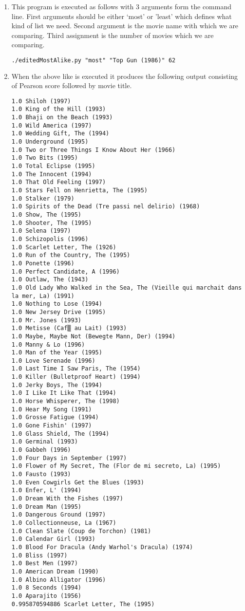 \begin{enumerate}
\item This program is executed as follows with 3 arguments form the command line. First arguments should be either `most' or 'least' which defines what kind of list we need. Second argument is the movie name with which we are comparing. Third assignment is the number of movies which we are comparing.
\begin{lstlisting}[frame=single]
 ./editedMostAlike.py "most" "Top Gun (1986)" 62
\end{lstlisting}
\item When the above like is executed it produces the following output consisting of Pearson score followed by movie title. 
\begin{lstlisting}[frame=single,breaklines=true]
1.0 Shiloh (1997)
1.0 King of the Hill (1993)
1.0 Bhaji on the Beach (1993)
1.0 Wild America (1997)
1.0 Wedding Gift, The (1994)
1.0 Underground (1995)
1.0 Two or Three Things I Know About Her (1966)
1.0 Two Bits (1995)
1.0 Total Eclipse (1995)
1.0 The Innocent (1994)
1.0 That Old Feeling (1997)
1.0 Stars Fell on Henrietta, The (1995)
1.0 Stalker (1979)
1.0 Spirits of the Dead (Tre passi nel delirio) (1968)
1.0 Show, The (1995)
1.0 Shooter, The (1995)
1.0 Selena (1997)
1.0 Schizopolis (1996)
1.0 Scarlet Letter, The (1926)
1.0 Run of the Country, The (1995)
1.0 Ponette (1996)
1.0 Perfect Candidate, A (1996)
1.0 Outlaw, The (1943)
1.0 Old Lady Who Walked in the Sea, The (Vieille qui marchait dans la mer, La) (1991)
1.0 Nothing to Lose (1994)
1.0 New Jersey Drive (1995)
1.0 Mr. Jones (1993)
1.0 Metisse (Caf▒ au Lait) (1993)
1.0 Maybe, Maybe Not (Bewegte Mann, Der) (1994)
1.0 Manny & Lo (1996)
1.0 Man of the Year (1995)
1.0 Love Serenade (1996)
1.0 Last Time I Saw Paris, The (1954)
1.0 Killer (Bulletproof Heart) (1994)
1.0 Jerky Boys, The (1994)
1.0 I Like It Like That (1994)
1.0 Horse Whisperer, The (1998)
1.0 Hear My Song (1991)
1.0 Grosse Fatigue (1994)
1.0 Gone Fishin' (1997)
1.0 Glass Shield, The (1994)
1.0 Germinal (1993)
1.0 Gabbeh (1996)
1.0 Four Days in September (1997)
1.0 Flower of My Secret, The (Flor de mi secreto, La) (1995)
1.0 Fausto (1993)
1.0 Even Cowgirls Get the Blues (1993)
1.0 Enfer, L' (1994)
1.0 Dream With the Fishes (1997)
1.0 Dream Man (1995)
1.0 Dangerous Ground (1997)
1.0 Collectionneuse, La (1967)
1.0 Clean Slate (Coup de Torchon) (1981)
1.0 Calendar Girl (1993)
1.0 Blood For Dracula (Andy Warhol's Dracula) (1974)
1.0 Bliss (1997)
1.0 Best Men (1997)
1.0 American Dream (1990)
1.0 Albino Alligator (1996)
1.0 8 Seconds (1994)
1.0 Aparajito (1956)
0.995870594886 Scarlet Letter, The (1995)
\end{lstlisting}


\end{enumerate}

